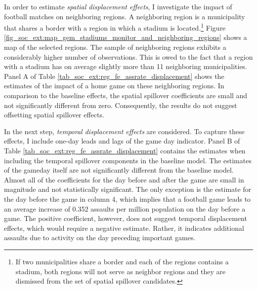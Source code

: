 In order to estimate \textit{spatial displacement effects}, I investigate the impact of football matches on neighboring regions. A neighboring region is a municipality that shares a border with a region in which a stadium is located.\footnote{If two municipalities share a border and each of the regions contains a stadium, both regions will not serve as neighbor regions and they are dismissed from the set of spatial spillover candidates.} Figure \ref{fig_soc_ext:map_gem_stadiums_monitor_and_neighboring_regions} shows a map of the selected regions. The sample of neighboring regions exhibits a considerably higher number of observations. This is owed to the fact that a region with a stadium has on average slightly more than 11 neighboring municipalities. Panel A of Table \ref{tab_soc_ext:reg_fe_assrate_displacement} shows the estimates of the impact of a home game on these neighboring regions. In comparison to the baseline effects, the spatial spillover coefficients are small and not significantly different from zero. Consequently, the results do not suggest offsetting spatial spillover effects.

In the next step, \textit{temporal displacement effects} are considered. To capture these effects, I include one-day leads and lags of the game day indicator. Panel B of Table \ref{tab_soc_ext:reg_fe_assrate_displacement} contains the estimates when including the temporal spillover components in the baseline model. The estimates of the gameday itself are not significantly different from the baseline model. Almost all of the coefficients for the day before and after the game are small in magnitude and not statistically significant. The only exception is the estimate for the day before the game in column 4, which implies that a football game leads to an average increase of 0.352 assaults per million population on the day before a game. The positive coefficient, however, does not suggest temporal displacement effects, which would require a negative estimate. Rather, it indicates additional assaults due to activity on the day preceding important games. 



